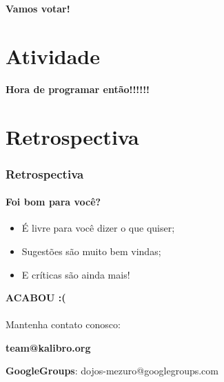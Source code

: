 \documentclass{beamer}
\begin{document}
\begin{frame}
  \LARGE{\textbf{Vamos votar!}}
\end{frame}

\section{Atividade}
\begin{frame}
  \LARGE{\textbf{Hora de programar então!!!!!!}}
\end{frame}

\section{Retrospectiva}
\begin{frame}
  \frametitle{Retrospectiva}
  \framesubtitle{Foi bom para você?}

  \begin{itemize}
    \item É livre para você dizer o que quiser;
    \item Sugestões são muito bem vindas;
    \item E críticas são ainda mais!
  \end{itemize}
\end{frame}

\begin{frame}
  \LARGE{\textbf{ACABOU :(}} \\~\\

  Mantenha contato conosco:

  \textbf{team@kalibro.org}

  \textbf{GoogleGroups}: dojos-mezuro@googlegroups.com
\end{frame}
\end{document}
